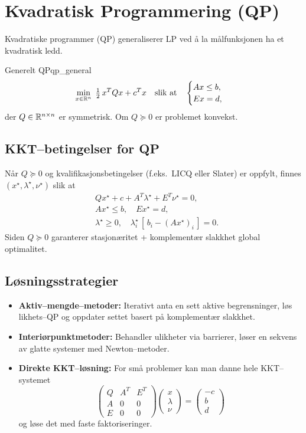 \section{Kvadratisk Programmering (QP)}
Kvadratiske programmer (QP) generaliserer LP ved å la målfunksjonen ha et kvadratisk ledd.

\begin{definition}{Generelt QP}{qp_general}
	\[
		\min_{x\in\mathbb{R}^n}\;\tfrac12\,x^T Q x + c^T x
		\quad\text{slik at}\quad
		\begin{cases}
			A x \le b, \\
			E x = d,
		\end{cases}
	\]
	der $Q\in\mathbb{R}^{n\times n}$ er symmetrisk. Om $Q\succeq0$ er problemet konvekst.
\end{definition}

\subsection{KKT--betingelser for QP}
Når $Q\succeq0$ og kvalifikasjonsbetingelser (f.eks.\ LICQ eller Slater) er oppfylt, finnes $(x^\star,\lambda^\star,\nu^\star)$ slik at
\begin{align}
	 & Qx^\star + c + A^T\lambda^\star + E^T\nu^\star = 0,                   \\
	 & A x^\star \le b,\quad E x^\star = d,                                  \\
	 & \lambda^\star\ge0,\quad \lambda^\star_i\,[\,b_i - (A x^\star)_i\,]=0.
\end{align}
Siden $Q\succeq0$ garanterer stasjonæritet + komplementær slakkhet global optimalitet.

\subsection{Løsningsstrategier}
\begin{itemize}
	\item \textbf{Aktiv--mengde--metoder:} Iterativt anta en sett aktive begrensninger, løs likhets--QP og oppdater settet basert på komplementær slakkhet.
	\item \textbf{Interiørpunktmetoder:} Behandler ulikheter via barrierer, løser en sekvens av glatte systemer med Newton--metoder.
	\item \textbf{Direkte KKT--løsning:} For små problemer kan man danne hele KKT--systemet
	      \[
		      \begin{pmatrix}
			      Q & A^T & E^T \\
			      A & 0   & 0   \\
			      E & 0   & 0
		      \end{pmatrix}
		      \begin{pmatrix}x\\\lambda\\\nu\end{pmatrix}
		      =
		      \begin{pmatrix}-c\\b\\d\end{pmatrix}
	      \]
	      og løse det med faste faktoriseringer.
\end{itemize}

